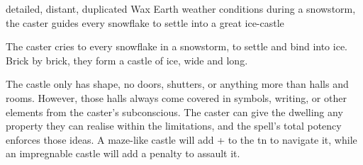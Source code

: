   {detailed, distant, duplicated}%
  {Wax}%
  {Earth}%
  {weather conditions}%
  {during a snowstorm, the caster guides every snowflake to settle into a great ice-castle}%
  {
    The caster cries to every snowflake in a snowstorm, to settle and bind into ice.
    Brick by brick, they form a castle of ice,  wide and long.

    The castle only has shape, no doors, shutters, or anything more than halls and rooms.
    However, those halls always come covered in symbols, writing, or other elements from the caster's subconscious.
    The caster can give the dwelling any property they can realise within the limitations, and the spell's total potency enforces those ideas.
    A maze-like castle will add + to the \gls{tn} to navigate it, while an impregnable castle will add a penalty to assault it.
  }

